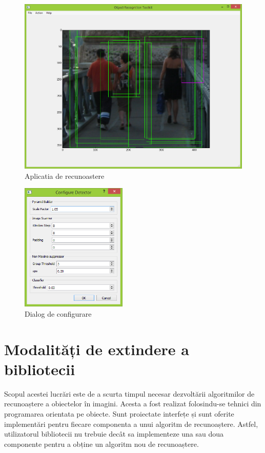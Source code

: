 \begin{figure}[H]
	\centering
		\includegraphics[width=1.00\textwidth]{imagini/aplicatia.png}
	\caption{Aplicatia de recunoastere}
	\label{fig:aplicatia}
\end{figure}

\begin{figure}[H]
	\centering
		\includegraphics[width=0.45\textwidth]{imagini/dialog_configurare.png}
	\caption{Dialog de configurare}
	\label{fig:dialog_configurare}
\end{figure}


\section{Modalități de extindere a bibliotecii}

Scopul acestei lucrări este de a scurta timpul necesar dezvoltării algoritmilor de recunoaștere a obiectelor în imagini.
Acesta a fost realizat folosindu-se tehnici din programarea orientata pe obiecte.
Sunt proiectate interfețe și sunt oferite implementări pentru fiecare componenta a unui algoritm de recunoaștere.
Astfel, utilizatorul bibliotecii nu trebuie decât sa implementeze una sau doua componente pentru a obține un algoritm nou de recunoaștere.

